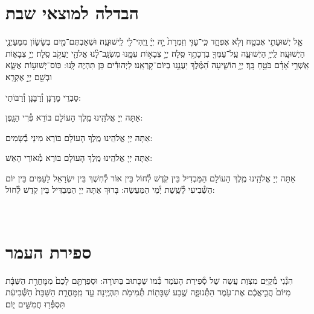 \documentclass[twoside, openany, parskip=half, 11pt]{book}
\begin{document}
\section[הבדלה]{ הבדלה למוצאי שבת } \label{havdala}

אֵ֧ל יְשׁוּעָתִ֛י אֶבְטַ֖ח וְלֹ֣א אֶפְחָ֑ד כִּֽי־עָזִּ֤י וְזִמְרָת֙ יָ֣הּ יְיָ֔ וַֽיְהִי־לִ֖י לִֽישׁוּעָֽה׃
וּשְׁאַבְתֶּם־מַ֖יִם בְּשָׂשׂ֑וֹן מִמַּעַיְנֵ֖י הַיְשׁוּעָֽה׃
לַֽייָ֥ הַיְשׁוּעָ֑ה עַֽל־עַמְּךָ֖ בִרְכָתֶ֣ךָ סֶּֽלָה׃
יְיָ֣ צְבָא֣וֹת עִמָּ֑נוּ מִשְׂגָּֽב־לָ֨נוּ אֱלֹהֵ֖י יַעֲקֹ֣ב סֶֽלָה׃
יְיָ֥ צְבָא֑וֹת אַֽשְׁרֵ֥י אָ֝דָ֗ם בֹּטֵ֥חַ בָּֽךְ׃
יְיָ֥ הוֹשִׁ֑יעָה הַ֝מֶּ֗לֶךְ יַעֲנֵ֥נוּ בְיוֹם־קׇרְאֵֽנוּ׃
לַיְּהוּדִ֕ים  כֵּן תִּהְיֶה לָּֽנוּ: כּֽוֹס־יְשׁוּע֥וֹת אֶשָּׂ֑א וּבְשֵׁ֖ם יְיָ֣ אֶקְרָֽא׃

\begin{scriptsize}
סַבְרֵי מָרָנָן וְ֯רַבָּנָן וְ֯רַבּוֹתַי: \\
\end{scriptsize}
אַתָּה יְיָ אֱלֹהֵֽינוּ מֶֽלֶךְ הָעוֹלָם בּוֹרֵא פְּ֯רִי הַגָּֽפֶן:

אַתָּה יְיָ אֱלֹהֵֽינוּ מֶֽלֶךְ הָעוֹלָם בּוֹרֵא מִינֵי בְ֯שָׂמִים:

אַתָּה יְיָ אֱלֹהֵֽינוּ מֶֽלֶךְ הָעוֹלָם בּוֹרֵא מְ֯אוֹרֵי הָאֵשׁ:

אַתָּה יְיָ אֱלֹהֵֽינוּ מֶֽלֶךְ הָעוֹלָם הַמַּבְדִיל בֵּין קֹֽדֶשׁ לְ֯חוֹל בֵּין אוֹר לְ֯חֽשֶׁךְ בֵּין יִשְׂרָאֵל לָעַמִּים בֵּין יוֹם הַשְּׁ֯בִיעִי לְ֯שֵֽׁשֶׁת יְ֯מֵי הַמַּעֲשֶׂה: בָּרוּךְ אַתָּה יְיָ הַמַּבְדִּיל בֵּין קֹֽדֶשׁ לְ֯חוֹל:
\clearpage

\vspace{-1.3\baselineskip}










\quad{}\quad{}\\

\section{ספירת העמר}
\label{sefiras haomer}

הִנְ֯נִי מְ֯קַיֵּם מִצְוַת עֲשֵה שֶׁל סְ֯פִירַת הָעֽׂמֶר כְּ֯מוׂ שֶׁכָּתוּב בַּתּוׂרָה: וּסְפַרְתֶּ֤ם לָכֶם֙ מִמׇּחֳרַ֣ת הַשַּׁבָּ֔ת מִיּוֹם֙ הֲבִ֣יאֲכֶ֔ם אֶת־עֹ֖מֶר הַתְּ֯נוּפָ֑ה שֶׁ֥בַע שַׁבָּת֖וֹת תְּ֯מִימֹ֥ת תִּהְיֶֽינָה׃ עַ֣ד מִֽמׇּחֳרַ֤ת הַשַּׁבָּת֙ הַשְּׁ֯בִיעִ֔ת תִּסְפְּ֯ר֖וּ חֲמִשִּׁ֣ים י֑וֹם׃
\end{document}
